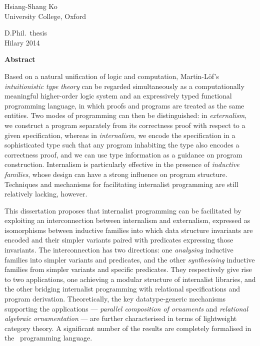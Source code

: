 \documentclass[dissertation]{subfiles}
\begin{document}
\thispagestyle{empty}

\hypertarget{abstract}{}

\begin{center}


Hsiang-Shang Ko\\
University College, Oxford

D.Phil.~thesis\\
Hilary 2014

\end{center}

\noindent\hfil\textbf{Abstract}\hfil

\noindent
Based on a natural unification of logic and computation, Martin-Löf's \textit{intuitionistic type theory} can be regarded simultaneously as a computationally meaningful higher-order logic system and an expressively typed functional programming language, in which proofs and programs are treated as the same entities.
Two modes of programming can then be distinguished: in \textit{externalism}, we construct a program separately from its correctness proof with respect to a given specification, whereas in \textit{internalism}, we encode the specification in a sophisticated type such that any program inhabiting the type also encodes a correctness proof, and we can use type information as a guidance on program construction.
Internalism is particularly effective in the presence of \textit{inductive families}, whose design can have a strong influence on program structure.
Techniques and mechanisms for facilitating internalist programming are still relatively lacking, however.

This dissertation proposes that internalist programming can be facilitated by exploiting an interconnection between internalism and externalism, expressed as isomorphisms between inductive families into which data structure invariants are encoded and their simpler variants paired with predicates expressing those invariants.
The interconnection has two directions: one \textit{analysing} inductive families into simpler variants and predicates, and the other \textit{synthesising} inductive families from simpler variants and specific predicates.
They respectively give rise to two applications, one achieving a modular structure of internalist libraries, and the other bridging internalist programming with relational specifications and program derivation.
Theoretically, the key datatype-generic mechanisms supporting the applications --- \textit{parallel composition of ornaments} and \textit{relational algebraic ornamentation} --- are further characterised in terms of lightweight category theory.
A significant number of the results are completely formalised in the \Agda\ programming language.
\end{document}
